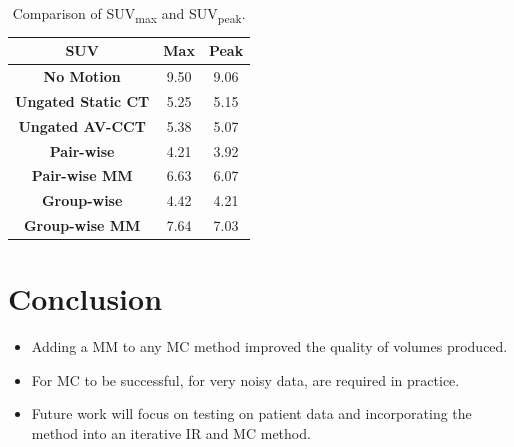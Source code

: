 \documentclass[misc, color=UCLburgundy, margin=1cm]{uclposter}
\DeclareRobustCommand{\glss}[1]
{%
  \ifglsused{#1}{\glsshorts{#1}}{\glslongs{#1} (\glsshorts{#1})\glsunset{#1}}%
}
\begin{document}
\begin{multicols}{4}
            \begin{table}[H]
                \centering
                \begin{highlightbox}[UCLlightblue]
                    \captionsetup{singlelinecheck=false, justification=centering}
                    \caption{Comparison of \gls{SUV}\textsubscript{max} and \gls{SUV}\textsubscript{peak}.}
                \end{highlightbox}
                \vspace{1.0cm}
                \resizebox*{1.0\linewidth}{!}
                {
                    \begin{tabular}{||c|cc||}
                        \hline
                        \textbf{\gls{SUV}}                  & \textbf{Max}  & \textbf{Peak} \\
                        \hline
                        \textbf{No Motion}                  & 9.50        & 9.06 \\
                        \hline
                        \textbf{Ungated Static \gls{CT}}    & 5.25        & 5.15 \\
                        \textbf{Ungated \acrlong{AV-CCT}}       & 5.38        & 5.07 \\
                        \hline
                        \textbf{Pair-wise}                  & 4.21        & 3.92 \\
                        \textbf{Pair-wise \gls{MM}}         & 6.63        & 6.07 \\
                        \hline
                        \textbf{Group-wise}                 & 4.42        & 4.21 \\
                        \textbf{Group-wise \gls{MM}}        & 7.64        & 7.03 \\
                        \hline
                    \end{tabular}
                }
            \end{table}
        
        \section*{Conclusion}
            \begin{itemize}
                \item Adding a \gls{MM} to any \gls{MC} method improved the quality of volumes produced.
                \item For \gls{MC} to be successful, for very noisy data, \glss{MM} are required in practice.
                \item Future work will focus on testing on patient data and incorporating the method into an iterative \acrlong{IR} and \gls{MC} method.
            \end{itemize}
        
        \AtNextBibliography{\tiny}
        \printbibliography
    \end{multicols}
\end{document}
